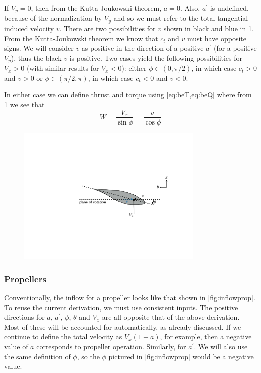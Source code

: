\documentclass{article}
\begin{document}

If $V_y = 0$, then from the Kutta-Joukowski theorem, $a = 0$.  Also, $a^\prime$ is undefined, because of the normalization by $V_y$ and so we must refer to the total tangential induced velocity $v$.  There are two possibilities for $v$ shown in black and blue in \cref{fig:inflowv}.  From the Kutta-Joukowski theorem we know that $c_t$ and $v$ must have opposite signs.  We will consider $v$ as positive in the direction of a positive $a^\prime$ (for a positive $V_y$), thus the black $v$ is positive.  Two cases yield the following possibilities for $V_x > 0$ (with similar results for $V_x < 0$): either $\phi \in (0, \pi/2)$, in which case $c_t > 0$ and $v > 0$ or $\phi \in (\pi/2, \pi)$, in which case $c_t < 0$ and $v < 0$.

In either case we can define thrust and torque using \cref{eq:beT,eq:beQ} where from \cref{fig:inflowv} we see that
\begin{equation}
    W = \frac{V_x}{\sin\phi} = \frac{v}{\cos\phi}
\end{equation}


\begin{figure}[htbp]
\centering
\includegraphics[width=3.5in]{figures/inflow5}
\caption{}
\label{fig:inflowv}
\end{figure}

\subsubsection{Propellers}

Conventionally, the inflow for a propeller looks like that shown in \cref{fig:inflowprop}.  To reuse the current derivation, we must use consistent inputs.  The positive directions for $a$, $a^\prime$, $\phi$, $\theta$ and $V_x$ are all opposite that of the above derivation.  Most of these will be accounted for automatically, as already discussed.  If we continue to define the total velocity as $V_x (1 - a)$, for example, then a negative value of $a$ corresponds to propeller operation.  Similarly, for $a^\prime$.  We will also use the same definition of $\phi$, so the $\phi$ pictured in \cref{fig:inflowprop} would be a negative value.
\end{document}
